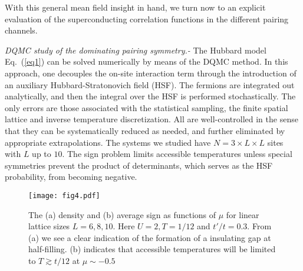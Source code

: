 \documentclass[%
 reprint,
 amsmath,amssymb,
 aps,
]{revtex4-1}
\begin{document}
With this general mean field insight in hand, we turn now to
an explicit evaluation of the superconducting correlation
functions in the different pairing channels.


\textit{DQMC study of the dominating pairing symmetry.-}
The Hubbard model Eq.~(\ref{eq1}) can be solved numerically by means of the
DQMC method\cite{white89a,dqmc}. In this approach, one decouples the on-site
interaction term through the introduction of an auxiliary
Hubbard-Stratonovich field (HSF).  The fermions are integrated
out analytically, and then the integral over the HSF is performed
stochastically.  The
only errors are those associated with the statistical sampling, the
finite spatial lattice
and inverse temperature discretization.
All
are well-controlled in the sense that they can be systematically reduced
as needed, and further eliminated by appropriate extrapolations. The
systems we studied have $N=3\times L \times L$ sites with $L$ up to
$10$.
The sign problem\cite{loh90,troyer05,vlad2015} limits accessible temperatures
unless special symmetries prevent the product of determinants,
which serves as the HSF probability, from becoming negative.

\begin{figure}[htbp]
\centering \texttt{[image: fig4.pdf]}
\caption{
The (a) density and (b) average sign as functions of $\mu$ for linear
lattice sizes $L=6,8,10$. Here $U=2, T=1/12$ and $t'/t=0.3$.
From (a) we see a clear indication of the formation of a
insulating gap at half-filling.  (b) indicates that accessible
temperatures will be limited to $T \gtrsim t/12$ at $\mu \sim -0.5$
}
\label{fig4}
\end{figure}
\end{document}
